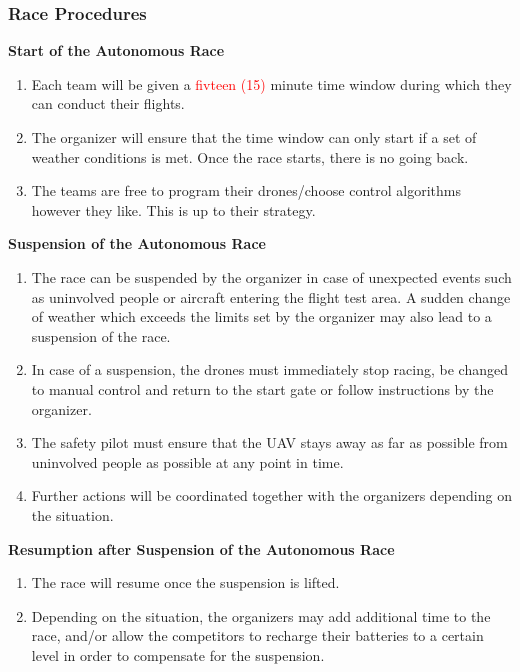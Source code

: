     \subsubsection{Race Procedures}
    \textbf{Start of the Autonomous Race}
    \begin{enumerate}
    \item Each team will be given a \textcolor{red}{fivteen (15)} minute time window during which they can conduct their flights. 
    \item The organizer will ensure that the time window can only start if a set of weather conditions is met. Once the race starts, there is no going back.
    \item The teams are free to program their drones/choose control algorithms however they like. This is up to their strategy. 
    \end{enumerate}

    \textbf{Suspension of the Autonomous Race}
    \begin{enumerate}[resume]
    \item The race can be suspended by the organizer in case of unexpected events such as uninvolved people or aircraft entering the flight test area. A sudden change of weather which exceeds the limits set by the organizer may also lead to a suspension of the race.
    \item In case of a suspension, the drones must immediately stop racing, be changed to manual control and return to the start gate or follow instructions by the organizer.
    \item The safety pilot must ensure that the UAV stays away as far as possible from uninvolved people as possible at any point in time.
    \item Further actions will be coordinated together with the organizers depending on the situation.
    \end{enumerate}

    \textbf{Resumption after Suspension of the Autonomous Race}
    \begin{enumerate}[resume]
    \item The race will resume once the suspension is lifted.
    \item Depending on the situation, the organizers may add additional time to the race, and/or allow the competitors to recharge their batteries to a certain level in order to compensate for the suspension.
    \end{enumerate}

    

  




